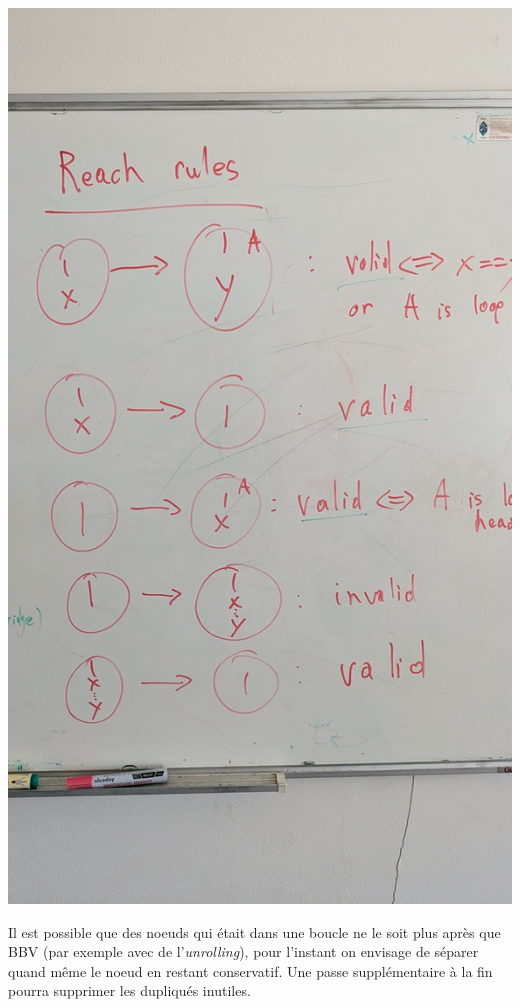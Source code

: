 \documentclass[a4paper,11pt]{article}
\begin{document}
\begin{center}
\includegraphics[width=\textwidth]{reach-rules}
\end{center}

Il est possible que des noeuds qui était dans une boucle ne le soit plus après
que BBV (par exemple avec de l'\emph{unrolling}), pour l'instant on envisage de
séparer quand même le noeud en restant conservatif. Une passe supplémentaire à
la fin pourra supprimer les dupliqués inutiles.
\end{document}
